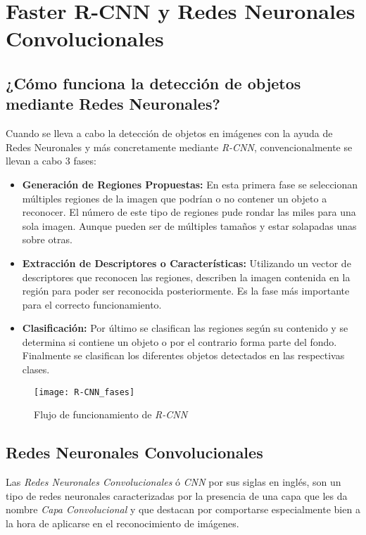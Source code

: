 \section{Faster R-CNN y Redes Neuronales Convolucionales}

\subsection{¿Cómo funciona la detección de objetos mediante Redes Neuronales?}
Cuando se lleva a cabo la detección de objetos en imágenes con la ayuda de Redes Neuronales y más concretamente mediante \emph{R-CNN}, convencionalmente se llevan a cabo 3 fases:

\begin{itemize}
    \item \textbf{Generación de Regiones Propuestas:} En esta primera fase se seleccionan múltiples regiones de la imagen que podrían o no contener un objeto a reconocer. El número de este tipo de regiones pude rondar las miles para una sola imagen. Aunque pueden ser de múltiples tamaños y estar solapadas unas sobre otras.
    \item \textbf{Extracción de Descriptores o Características:} Utilizando un vector de descriptores que reconocen las regiones, describen la imagen contenida en la región para poder ser reconocida posteriormente. Es la fase más importante para el correcto funcionamiento. 
    \item \textbf{Clasificación:} Por último se clasifican las regiones según su contenido y se determina si contiene un objeto o por el contrario forma parte del fondo. Finalmente se clasifican los diferentes objetos detectados en las respectivas clases.
\end{itemize}

\begin{figure}[htb]
	\centering
	\texttt{[image: R-CNN\_fases]}
	\caption[Flujo de funcionamiento de \emph{R-CNN}]{Flujo de funcionamiento de \emph{R-CNN} \cite{girshick2014rich}}
\end{figure}

\subsection{Redes Neuronales Convolucionales}
Las \emph{Redes Neuronales Convolucionales} ó \emph{CNN} por sus siglas en inglés, son un tipo de redes neuronales caracterizadas por la presencia de una capa que les da nombre \emph{Capa Convolucional} y que destacan por comportarse especialmente bien a la hora de aplicarse en el reconocimiento de imágenes.

